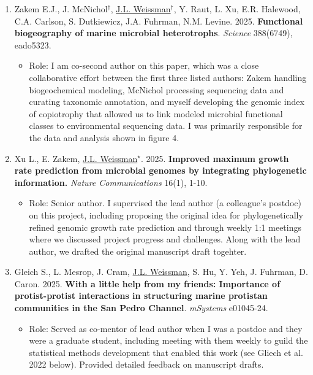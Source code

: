 \documentclass[]{res}
\begin{document}
\begin{resume}
\begin{enumerate}[leftmargin=*]
\item Zakem E.J., J. McNichol$^\dagger$, \underline{J.L. Weissman}$^\dagger$, Y. Raut, L. Xu, E.R. Halewood, C.A. Carlson, S. Dutkiewicz, J.A. Fuhrman, N.M. Levine. 2025. {\bf Functional biogeography of marine microbial heterotrophs}. \emph{Science} 388(6749), eado5323.

 \begin{itemize}
 	\item Role: I am co-second author on this paper, which was a close collaborative effort between the first three listed authors: Zakem handling biogeochemical modeling, McNichol processing sequencing data and curating taxonomic annotation, and myself developing the genomic index of copiotrophy that allowed us to link modeled microbial functional classes to environmental sequencing data. I was primarily responsible for the data and analysis shown in figure 4. 
 \end{itemize}
 
\item Xu L., E. Zakem, \underline{J.L. Weissman$^\star$}. 2025. {\bf Improved maximum growth rate prediction from microbial genomes by integrating phylogenetic information.} \emph{Nature Communications} 16(1), 1-10.

\begin{itemize}
	\item Role: Senior author. I supervised the lead author (a colleague's postdoc) on this project, including proposing the original idea for phylogenetically refined genomic growth rate prediction and through weekly 1:1 meetings where we discussed project progress and challenges. Along with the lead author, we drafted the original manuscript draft togehter.
\end{itemize}

\item Gleich S., L. Mesrop, J. Cram, \underline{J.L. Weissman}, S. Hu, Y. Yeh, J. Fuhrman, D. Caron. 2025. {\bf With a little help from my friends: Importance of protist-protist interactions in structuring marine protistan communities in the San Pedro Channel}. \emph{mSystems} e01045-24.

\begin{itemize}
	\item Role: Served as co-mentor of lead author when I was a postdoc and they were a graduate student, including meeting with them weekly to guild the statistical methods development that enabled this work (see Gliech et al. 2022 below). Provided detailed feedback on manuscript drafts.
\end{itemize}
 

\end{enumerate}
\end{resume}
\end{document}
